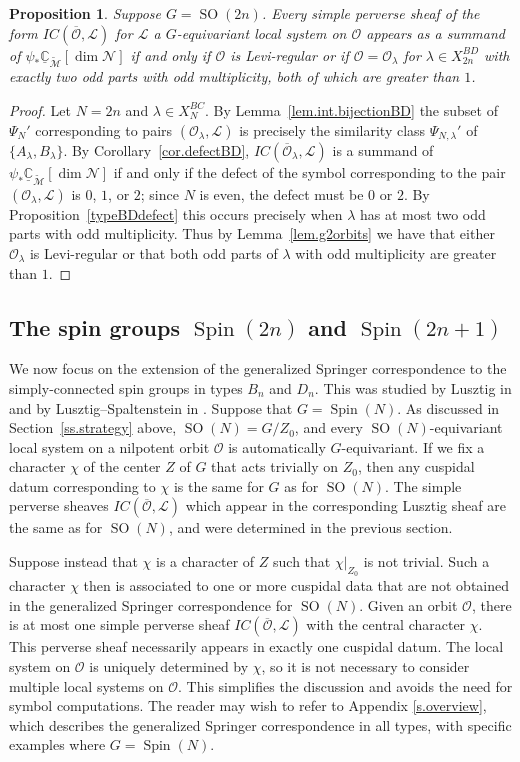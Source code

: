 \documentclass[reqno,11pt]{amsart}
\newtheorem{Prop}[Thm]{Proposition}
\theoremstyle{remark}
\theoremstyle{remark}
\theoremstyle{definition}
\theoremstyle{definition}
\theoremstyle{definition}
\numberwithin{equation}{section}
\newcommand{\C}{\mathbb{C}}           %
\newcommand{\SO}{\operatorname{SO}}
\newcommand{\Spin}{\operatorname{Spin}}
\newcommand{\cl}{\mathcal{L}}
\newcommand{\cm}{\mathcal{M}}
\newcommand{\cn}{\mathcal{N}}
\newcommand{\co}{\mathcal{O}}
\newcommand{\shc}{\underline{\C}}
\renewcommand{\tilde}{\widetilde}
\begin{document}
\begin{Prop}\label{prop.orthogonal.even} Suppose $G=\SO(2n)$. Every simple perverse sheaf of the form $IC(\overline{\co}, \cl)$  for $\cl$ a $G$-equivariant local system on $\co$ appears as a summand of $\psi_*\shc_{\tilde{\cm}}[\dim \cn]$ if and only if $\co$ is Levi-regular or if $\co=\co_\lambda$ for $\lambda\in X_{2n}^{BD}$ with exactly two odd parts with odd multiplicity, both of which are greater than $1$.
\end{Prop}
\begin{proof}  Let $N=2n$ and $\lambda\in X_{N}^{BC}$.   By Lemma~\ref{lem.int.bijectionBD} the subset of $\Psi_{N}'$ corresponding to pairs $(\co_\lambda, \cl)$ is precisely the similarity class $\Psi_{N,\lambda}'$ of $\{A_\lambda, B_\lambda\}$. 
By Corollary~\ref{cor.defectBD}, $IC(\overline{\co}_\lambda, \cl)$ is a summand of $\psi_*\shc_{\tilde{\cm}}[\dim \cn]$ if and only if the defect of the symbol corresponding to the pair $(\co_\lambda, \cl)$ is $0$, $1$, or $2$; since $N$ is even, the defect must be $0$ or $2$. 
By Proposition~\ref{typeBDdefect} this occurs precisely when $\lambda$ has at most two odd parts with odd multiplicity. Thus by Lemma~\ref{lem.g2orbits} we have that either $\co_\lambda$ is Levi-regular or that both odd parts of $\lambda$ with odd multiplicity are greater than $1$. 
\end{proof}


\subsection{The spin groups $\Spin(2n)$ and $\Spin(2n+1)$}  \label{ss.spin}
We now focus on the extension of the generalized Springer correspondence to the simply-connected spin groups in types $B_n$ and $D_n$.  This was studied by Lusztig in \cite[\S 14]{Lu84} and by Lusztig--Spaltenstein in \cite{LuSpal85}.  
Suppose that $G = \Spin(N)$. As discussed in Section~\ref{ss.strategy} above,  $\SO(N)= G/Z_0$, and every $\SO(N)$-equivariant local system on a nilpotent orbit $\co$ is automatically $G$-equivariant.  
If we fix a character $\chi$ of the center $Z$ of $G$ that acts trivially on $Z_0$, then any cuspidal datum corresponding to $\chi$ is the same for $G$ as for $\SO(N)$.
The simple perverse sheaves $IC(\overline{\co},\cl)$ which appear in the corresponding Lusztig sheaf are the same as for $\SO(N)$, and were determined in the previous section.  

Suppose instead that $\chi$ is a character of $Z$ such that $\chi|_{Z_0}$ is not trivial.  Such a character $\chi$ then is associated to one or more cuspidal data that are not obtained in the generalized Springer correspondence for $\SO(N)$.  Given an orbit $\co$, there is at most one simple perverse sheaf
$IC(\overline{\co}, \cl)$ with the central character $\chi$.  This perverse sheaf necessarily appears in exactly one cuspidal datum.  
The local system on $\co$ is uniquely determined by $\chi$, so
it is not
necessary to consider multiple local systems on $\co$.
This simplifies the discussion and avoids the need for symbol computations.  
The reader may wish to refer to Appendix \ref{s.overview}, which describes the generalized Springer correspondence in all types, with specific examples where $G = \Spin(N)$.
\end{document}
